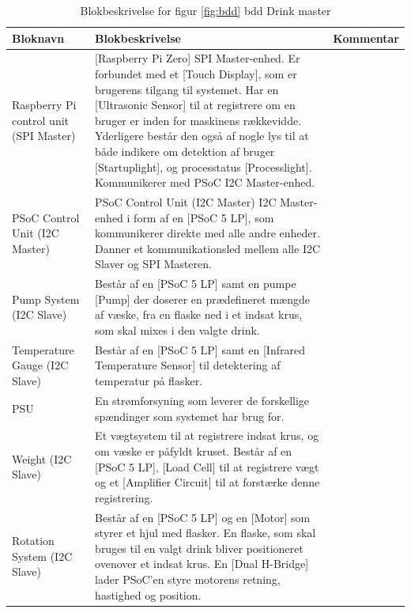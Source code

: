 \begin{table}[H] 
	\centering 
	\begin{tabular}{|p{3.5cm}|p{7cm}|p{2.5cm}|}
		\hline
\textbf{Bloknavn} & \textbf{Blokbeskrivelse}  &  \textbf{Kommentar}  \\ \hline
Raspberry Pi control unit (SPI Master)   & [Raspberry Pi Zero] SPI Master-enhed. Er forbundet med et [Touch Display], som er brugerens tilgang til systemet.  Har en [Ultrasonic Sensor] til at registrere om en bruger er inden for maskinens rækkevidde. Yderligere består den også af nogle lys til at både indikere om detektion af bruger [Startuplight], og processtatus [Processlight]. Kommunikerer med PSoC I2C Master-enhed. &  \\ \hline
PSoC Control Unit (I2C Master) & PSoC Control Unit
(I2C Master)	I2C Master-enhed i form af en [PSoC 5 LP], som kommunikerer direkte med alle andre enheder. Danner et kommunikationsled mellem alle I2C Slaver og SPI Masteren.   &  \\ \hline
Pump System (I2C Slave)              & Består af en [PSoC 5 LP] samt en pumpe [Pump] der doserer en prædefineret mængde af væske, fra en flaske ned i et indsat krus, som skal mixes i den valgte drink.                       &  \\ \hline
Temperature Gauge (I2C Slave) & Består af en [PSoC 5 LP] samt en [Infrared Temperature Sensor] til detektering af temperatur på flasker.  &  \\ \hline
PSU               & En strømforsyning som leverer de forskellige spændinger som systemet har brug for.                                                                               &  \\  \hline
Weight (I2C Slave)            & Et vægtsystem til at registrere indsat krus, og om væske er påfyldt kruset. Består af en [PSoC 5 LP], [Load Cell] til at registrere vægt og et [Amplifier Circuit] til at forstærke denne registrering.     &  \\ \hline
Rotation System (I2C Slave)   & Består af en [PSoC 5 LP] og en [Motor] som styrer et hjul med flasker. En flaske, som skal bruges til en valgt drink bliver positioneret ovenover et indsat krus. En [Dual H-Bridge] lader PSoC’en styre motorens retning, hastighed og position.   &  \\ \hline
	\end{tabular}
	\caption{Blokbeskrivelse for figur \ref{fig:bdd} bdd Drink master}
	\label{tab:blokbeskrivelse}
\end{table}
\FloatBarrier
\newpage

